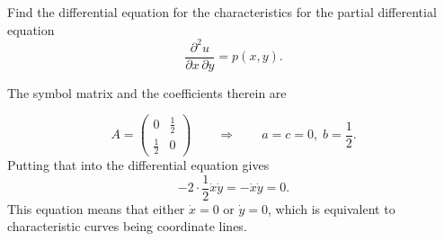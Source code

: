 Find the differential equation for the characteristics for the
partial differential equation
\[
\frac{\partial^2 u}{\partial x\,\partial y} = p(x,y).
\]

\begin{loesung}
The symbol matrix and the coefficients therein are

\[
A
=
\begin{pmatrix}
0&\frac12\\
\frac12&0
\end{pmatrix}
\qquad\Rightarrow\qquad
a = c =0,\; b =\frac12.
\]
Putting that into the differential equation gives
\[
-2\cdot\frac12\dot{x}\dot{y} = -\dot{x}\dot{y}= 0.
\]
This equation means that either $\dot{x}=0$ or $\dot{y}=0$,
which is equivalent to characteristic curves being coordinate lines.
\end{loesung}

